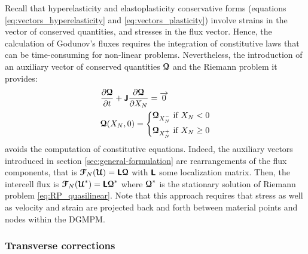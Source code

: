 Recall that hyperelasticity and elastoplasticity conservative forms (equations \eqref{eq:vectors_hyperelasticity} and \eqref{eq:vectors_plasticity}) involve strains in the vector of conserved quantities, and stresses in the flux vector.
Hence, the calculation of Godunov's fluxes requires the integration of constitutive laws that can be time-consuming for non-linear problems. Nevertheless, the introduction of an auxiliary vector of conserved quantities ${\boldsymbol{\mathcal{Q}}}$ and the Riemann problem it provides:
\begin{equation}
  \label{eq:RP_quasilinear}
  \begin{aligned}
    &\frac{\partial {\boldsymbol{\mathcal{Q}}}}{\partial t} + \boldsymbol{\mathsf{J}} \frac{\partial {\boldsymbol{\mathcal{Q}}}}{\partial X_N} = {\overrightarrow{0}}  \\
    & {\boldsymbol{\mathcal{Q}}}(X_N,0)= \left\lbrace 
      \begin{aligned}
        & {\boldsymbol{\mathcal{Q}}}_{X_N^-} \text{ if } X_N <0 \\
        & {\boldsymbol{\mathcal{Q}}}_{X_N^{+}} \text{ if } X_N \geq 0
      \end{aligned}
        \right.
  \end{aligned}
\end{equation}
avoids the computation of constitutive equations. Indeed, the auxiliary vectors introduced in section \ref{sec:general-formulation} are rearrangements of the flux components, that is ${\boldsymbol{\mathcal{F}}}_N({\boldsymbol{\mathcal{U}}})=\boldsymbol{\mathsf{L}} {\boldsymbol{\mathcal{Q}}}$ with $\boldsymbol{\mathsf{L}}$ some localization matrix. Then, the intercell flux is ${\boldsymbol{\mathcal{F}}}_N({\boldsymbol{\mathcal{U}}}^*)=\boldsymbol{\mathsf{L}} {\boldsymbol{\mathcal{Q}}}^*$ where ${\boldsymbol{\mathcal{Q}}}^*$  is the stationary solution of Riemann problem \eqref{eq:RP_quasilinear}. Note that this approach requires that stress as well as velocity and strain are projected back and forth between material points and nodes within the DGMPM.

\subsubsection*{Transverse corrections}

